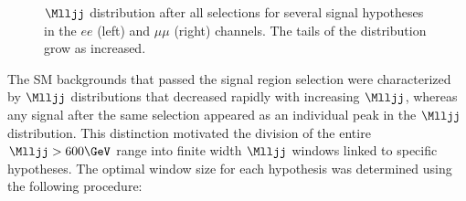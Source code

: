 \begin{figure}[btp]
	\centering
	\label{fig:signalShapesAfterSelection}
	\caption{$\Mlljj$ distribution after all selections for several \WR signal hypotheses in the $ee$ (left) and $\mu\mu$ (right) 
		channels.  The tails of the distribution grow as \mWR increased.}
\end{figure}

The SM backgrounds that passed the signal region selection were characterized by $\Mlljj$ 
distributions that decreased rapidly with increasing $\Mlljj$, whereas any \WR signal 
after the same selection appeared as an individual peak in the $\Mlljj$ distribution.  
This distinction motivated the division of the entire $\Mlljj > 600\GeV$ range into finite 
width $\Mlljj$ windows linked to specific \mWR hypotheses.  The optimal window size for each 
\mWR hypothesis was determined using the following procedure:

